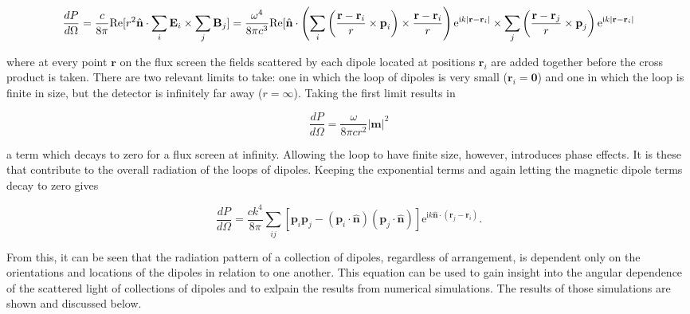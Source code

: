 \documentclass[journal=apchd5,manuscript=article]{achemso}
\begin{document}
\begin{equation}
\frac{dP}{d\Omega} = \frac{c}{8\pi}\textrm{Re}[r^2 \hat{\textbf{n}}\cdot \sum_i \textbf{E}_i \times \sum_j \textbf{B}_j]\\
= \frac{\omega^4}{8\pi c^3}\textrm{Re}[\hat{\textbf{n}}\cdot \left(\sum_i \left(\frac{\textbf{r}-\textbf{r}_i}{r}\times\textbf{p}_i\right)\times\frac{\textbf{r}-\textbf{r}_i}{r}\right)\textrm{e}^{\textrm{i}k|\textbf{r}-\textbf{r}_i|} \times \sum_j\left(\frac{\textbf{r}-\textbf{r}_j}{r}\times\textbf{p}_j\right)\textrm{e}^{\textrm{i}k|\textbf{r}-\textbf{r}_i|}
\label{diff_power_full}
\end{equation}

where at every point $\textbf{r}$ on the flux screen the fields scattered by each dipole located at positions $\textbf{r}_i$ are added together before the cross product is taken. There are two relevant limits to take: one in which the loop of dipoles is very small ($\textbf{r}_i = \textbf{0}$) and one in which the loop is finite in size, but the detector is infinitely far away ($r = \infty$). Taking the first limit results in

\begin{equation}
\frac{dP}{d\Omega} = \frac{\omega}{8\pi c r^2}|\textbf{m}|^2
\label{mag_dp}
\end{equation}

a term which decays to zero for a flux screen at infinity. Allowing the loop to have finite size, however, introduces phase effects. It is these that contribute to the overall radiation of the loops of dipoles. Keeping the exponential terms and again letting the magnetic dipole terms decay to zero gives

\begin{equation}
\frac{dP}{d\Omega} = \frac{ck^4}{8\pi}\sum_{ij}[\textbf{p}_i\textbf{p}_j - (\textbf{p}_i\cdot\hat{\textbf{n}})(\textbf{p}_j\cdot\hat{\textbf{n}})]\textrm{e}^{\textrm{i}k\hat{\textbf{n}}\cdot(\textbf{r}_j-\textbf{r}_i)}.
\label{dipoles_only_dp}
\end{equation}

From this, it can be seen that the radiation pattern of a collection of dipoles, regardless of arrangement, is dependent only on the orientations and locations of the dipoles in relation to one another. This equation can be used to gain insight into the angular dependence of the scattered light of collections of dipoles and to exlpain the results from numerical simulations. The results of those simulations are shown and discussed below.
\end{document}
